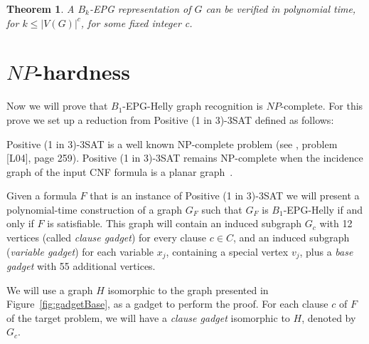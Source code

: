 \documentclass[9pt]{entcs}
\newtheorem{teo}{Theorem}[section]
\begin{document}
\begin{teo} \label{teo:npdificuldade}
A $B_k$-EPG representation of $G$ can be verified in polynomial time, for $k\leq |V(G)|^c$, for some fixed integer c.
\end{teo}


\section{$NP$-hardness}\label{sec:sectionDispositivoClausula}

Now we will prove that  $B_1$-EPG-Helly graph recognition is $NP$-complete. For this prove we set up a reduction from {\sc Positive (1 in 3)-3SAT} defined  as follows:



{\sc Positive (1 in 3)-3SAT } is a well known NP-complete problem (see \cite{johnson1979}, problem [L04], page 259). {\sc Positive (1 in 3)-3SAT} remains NP-complete when the incidence graph of the input CNF formula is a planar graph~\cite{mulzer2008minimum}.

Given a formula $F$ that is an instance of {\sc Positive (1 in 3)-3SAT} we will present a polynomial-time construction of a graph $ G_F$ such that $ G_F $ is $ B_1$-EPG-Helly if and only if $ F $ is satisfiable. This graph will contain an induced subgraph $ G_c$ with 12 vertices (called \emph {clause gadget}) for every clause $ c \in C $, and an induced subgraph (\emph {variable gadget}) for each variable $ x_j$, containing a special vertex  $ v_j$, plus a \emph{base gadget}  with 55 additional vertices.

We will use a graph $H$ isomorphic to the graph presented in Figure~\ref{fig:gadgetBase}, as a gadget to perform the proof. For each clause $c$ of $F$ of the target problem, we will have a \emph{clause gadget} isomorphic to $H$, denoted by $G_c$. %

 

\end{document}
